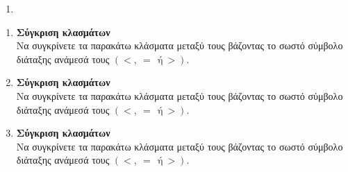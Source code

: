 \documentclass[twoside,nofonts,internet]{askhseis}
\begin{document}
\twocolkentro{\thewria}
\begin{enumerate}
\item 
\end{enumerate}
\twocolkentro{\askhseis}
\begin{enumerate}
\item \textbf{Σύγκριση κλασμάτων}\\
Να συγκρίνετε τα παρακάτω κλάσματα μεταξύ τους βάζοντας το σωστό σύμβολο διάταξης ανάμεσά τους $ (<,\ =\ \ \textrm{ή}\ >) $.
\begin{multicols}{3}
\end{multicols}
\item \textbf{Σύγκριση κλασμάτων}\\
Να συγκρίνετε τα παρακάτω κλάσματα μεταξύ τους βάζοντας το σωστό σύμβολο διάταξης ανάμεσά τους $ (<,\ =\ \ \textrm{ή}\ >) $.
\begin{multicols}{3}
\end{multicols}
\item \textbf{Σύγκριση κλασμάτων}\\
Να συγκρίνετε τα παρακάτω κλάσματα μεταξύ τους βάζοντας το σωστό σύμβολο διάταξης ανάμεσά τους $ (<,\ =\ \ \textrm{ή}\ >) $.
\begin{multicols}{3}
\end{multicols}
\end{enumerate}
\end{document}
